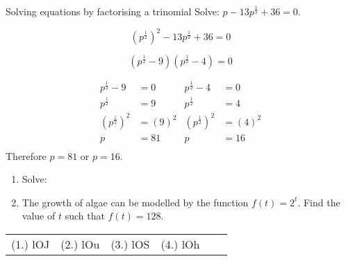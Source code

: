 \begin{wex}
{Solving equations by factorising a trinomial}
{Solve: $ p-13 p^{\frac{1}{2}} + 36 =  0$.}
{

$$ (p^{\frac{1}{2}})^2 -13p^{\frac{1}{2}} + 36 = 0 $$


$$ (p^{\frac{1}{2}} -9)(p^{\frac{1}{2}}-4) = 0 $$


\begin{align*}
p^{\frac{1}{2}} - 9 &= 0			&   p^{\frac{1}{2}} - 4 &= 0		\\
p^{\frac{1}{2}} &= 9				&   p^{\frac{1}{2}} &= 4		\\		
(p^{\frac{1}{2}})^2 &= (9)^2			&   (p^{\frac{1}{2}})^2 &= (4)^2\\
p &= 81				&   p &= 16\\
\end{align*} 
Therefore $p=81$ or $p=16$.
}
\end{wex}

\begin{exercises}{}{
\begin{enumerate}[label=\textbf{\arabic*}., itemsep=5pt]
\item Solve:

\begin{enumerate}[label=\textbf{(\alph*)}, itemsep=5pt]
\end{enumerate}

 \item The growth of algae can be modelled by the function $f(t) = 2^t$. Find the value of $t$ such that $f(t)=128$.   
\end{enumerate}
\practiceinfo
\par \practiceinfo
\begin{tabular}[h]{cccccc}
(1.) lOJ  &  (2.) lOu  &  (3.) lOS  &  (4.) lOh  & 
\end{tabular}
}
\end{exercises}

